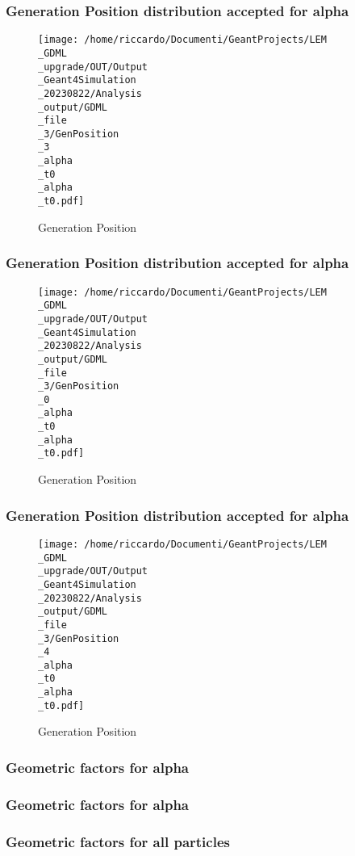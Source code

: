 \documentclass[8pt]{beamer}
\begin{document}
            \begin{frame}
                \frametitle{Generation Position distribution accepted for alpha}
            
        \begin{figure}[h]
            \centering
            \texttt{[image: /home/riccardo/Documenti/GeantProjects/LEM\\\_GDML\\\_upgrade/OUT/Output\\\_Geant4Simulation\\\_20230822/Analysis\\\_output/GDML\\\_file\\\_3/GenPosition\\\_3\\\_alpha\\\_t0\\\_alpha\\\_t0.pdf]}
            \caption{Generation Position}
        \end{figure}
        
            \end{frame}
            
            \begin{frame}
                \frametitle{Generation Position distribution accepted for alpha}
            
        \begin{figure}[h]
            \centering
            \texttt{[image: /home/riccardo/Documenti/GeantProjects/LEM\\\_GDML\\\_upgrade/OUT/Output\\\_Geant4Simulation\\\_20230822/Analysis\\\_output/GDML\\\_file\\\_3/GenPosition\\\_0\\\_alpha\\\_t0\\\_alpha\\\_t0.pdf]}
            \caption{Generation Position}
        \end{figure}
        
            \end{frame}
            
            \begin{frame}
                \frametitle{Generation Position distribution accepted for alpha}
            
        \begin{figure}[h]
            \centering
            \texttt{[image: /home/riccardo/Documenti/GeantProjects/LEM\\\_GDML\\\_upgrade/OUT/Output\\\_Geant4Simulation\\\_20230822/Analysis\\\_output/GDML\\\_file\\\_3/GenPosition\\\_4\\\_alpha\\\_t0\\\_alpha\\\_t0.pdf]}
            \caption{Generation Position}
        \end{figure}
        
            \end{frame}
            
            \begin{frame}
                \frametitle{Geometric factors for alpha}
            
            \end{frame}
            
            \begin{frame}
                \frametitle{Geometric factors for alpha}
            
            \end{frame}
            
            \begin{frame}
                \frametitle{Geometric factors for all particles}
            
            \end{frame}
            
        
\end{document}
